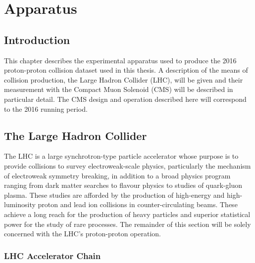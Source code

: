 
\chapter{Apparatus}
\label{chap:apparatus}



\section{Introduction}
This chapter describes the experimental apparatus used to produce the 2016 proton-proton collision dataset used in this thesis. A description of the means of collision production, the Large Hadron Collider (LHC), will be given and their measurement with the Compact Muon Solenoid (CMS) will be described in particular detail. The CMS design and operation described here will correspond to the 2016 running period.

\section{The Large Hadron Collider}
The LHC \cite{LHC_design_report} is a large synchrotron-type particle accelerator whose purpose is to provide collisions to survey electroweak-scale physics, particularly the mechanism of electroweak symmetry breaking, in addition to a broad physics program ranging from dark matter searches to flavour physics to studies of quark-gluon plasma.
These studies are afforded by the production of high-energy and high-luminosity proton and lead ion collisions in counter-circulating beams. These achieve a long reach for the production of heavy particles and superior statistical power for the study of rare processes. 
The remainder of this section will be solely concerned with the LHC's proton-proton operation.  

\subsection{LHC Accelerator Chain}

